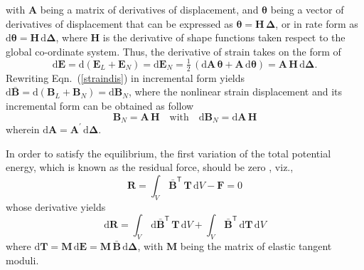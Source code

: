 with ${\mathbf{A}}$ being a matrix of derivatives of displacement, and $\boldsymbol{\theta}$ being a vector of derivatives of displacement that can be expressed as $\boldsymbol{\theta} = \mathbf{H} \, \boldsymbol{\Delta} $, or in rate form as $\mathrm{d} \boldsymbol{\theta} = \mathbf{H} \, \mathrm{d} \boldsymbol{\Delta}$, where $\mathbf{H}$ is the derivative of shape functions taken respect to the global co-ordinate system.  Thus, the derivative of strain takes on the form of
\begin{equation}
\mathrm{d} \mathbf{E} = \mathrm{d} (\mathbf{E}_L + \mathbf{E}_N) = \mathrm{d} \mathbf{E}_N = \tfrac{1}{2} \, (\mathrm{d} \mathbf{A} \, \boldsymbol{\theta} + \mathbf{A} \, \mathrm{d} \boldsymbol{\theta}) = \mathbf{A} \, \mathbf{H} \, \mathrm{d} \boldsymbol{\Delta} .
\label{dstrain1}
\end{equation} 
Rewriting Eqn.~(\ref{straindis}) in incremental form yields $\mathrm{d} \bar{\mathbf{B}} = \mathrm{d} (\mathbf{B}_L + \mathbf{B}_N) = \mathrm{d} \mathbf{B}_N$, where the nonlinear strain displacement and its incremental form can be obtained as follow
\begin{equation}
\mathbf{B}_N = \mathbf{A} \, \mathbf{H} \quad \text{with} \quad \mathrm{d} \mathbf{B}_N = \mathrm{d} \mathbf{A} \, \mathbf{H}
\end{equation} 
wherein $\mathrm{d} \mathbf{A} = \mathbf{A}^{'} \, \mathrm{d} \boldsymbol{\Delta} $.

In order to satisfy the equilibrium, the first variation of the total potential energy, which is known as the residual force, should be zero \cite{Elseifi98}, viz.,
\begin{equation}
\mathbf{R} = \int_{V} \, \bar{\mathbf{B}}^{\mathsf{T}} \, \mathbf{T} \, \mathrm{d} V - \mathbf{F} = 0
\label{residual}
\end{equation}
whose derivative yields
\begin{equation}
\mathrm{d} \mathbf{R} = \int_{V} \, \mathrm{d} \bar{\mathbf{B}}^{\mathsf{T}} \, \mathbf{T} \, \mathrm{d} V + \int_{V} \, \bar{\mathbf{B}}^{\mathsf{T}} \, \mathrm{d} \mathbf{T} \, \mathrm{d} V 
\label{diffresidual}
\end{equation}
where $\mathrm{d} \mathbf{T} = \mathbf{M} \, \mathrm{d} \mathbf{E} = \mathbf{M} \,  \bar{\mathbf{B}} \, \mathrm{d} \boldsymbol{\Delta}$, with $\mathbf{M}$ being the matrix of elastic tangent moduli. 

